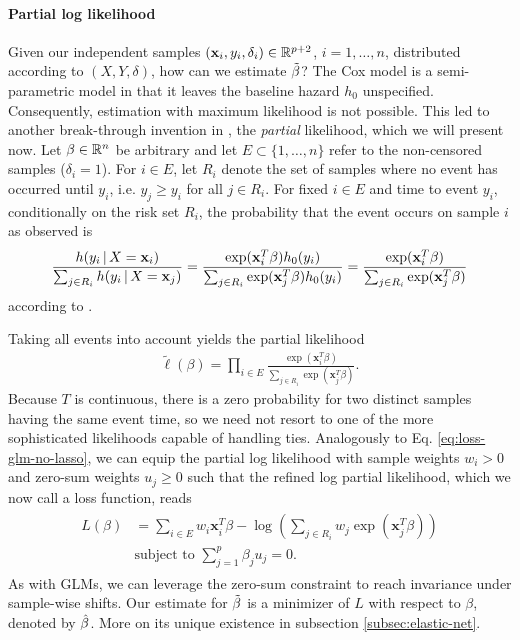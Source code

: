 \paragraph{Partial log likelihood}
Given our independent samples $(\mathbf{x}_i, y_i, \delta_i) \in \mathbb{R}^{p+2}$, $i = 1, \ldots, n$, distributed 
according to $(X, Y, \delta)$, how can we estimate $\tilde{\beta}$? The Cox model is a semi-parametric 
model in that it leaves the baseline hazard $h_0$ unspecified. Consequently, estimation with maximum 
likelihood is not possible. This led to another break-through invention in \cite{cox72}, the 
\textit{partial} likelihood, which we will present now. Let $\beta \in \mathbb{R}^n$ be arbitrary and let 
$E \subset \{ 1, \ldots, n \}$ refer to the non-censored samples ($\delta_i = 1$). For $i \in E$, 
let $R_i$ denote the set of samples 
where no event has occurred until $y_i$, i.e. $y_j \geq y_i$ for all $j \in R_i$. For
fixed $i \in E$ and time to event $y_i$, conditionally on the risk set $R_i$, the probability that 
the event occurs on sample $i$ as observed is
\begin{align}
    \frac{h(y_i \,|\, X = \mathbf{x}_i)}{\sum_{j \in R_i} h(y_i \,|\, X = \mathbf{x}_j)} = 
    \frac{\exp(\mathbf{x}_i^T \beta) h_0(y_i)}{\sum_{j \in R_i} \exp(\mathbf{x}_j^T \beta) h_0(y_i)} = 
    \frac{\exp(\mathbf{x}_i^T \beta)}{\sum_{j \in R_i} \exp(\mathbf{x}_j^T \beta)}
\end{align}
according to \cite[Eq. (12)]{cox72}.

Taking all events into account yields the partial likelihood 
\begin{align}\label{eq:cox-partial-lh}
    \tilde{\ell}(\beta) = \prod_{i \in E} \frac{\exp(\mathbf{x}_i^T \beta)}{\sum_{j \in R_i} \exp(\mathbf{x}_j^T 
    \beta)}.
\end{align}
Because $T$ is continuous, there is a zero probability for two distinct samples having the same 
event time, so we need not resort to one of the more sophisticated likelihoods capable of handling ties.
Analogously to Eq. \eqref{eq:loss-glm-no-lasso}, we can equip the partial log likelihood with sample 
weights $w_i > 0$ and zero-sum weights $u_j \geq 0$ such that the refined log partial likelihood, 
which we now call a loss function, reads 
\begin{align}\label{eq:cox-loss}
\begin{split}
    L(\beta) &= \sum_{i \in E} w_i \mathbf{x}_i^T \beta - \log \left( \sum_{j \in R_i} w_j \exp(\mathbf{x}_j^T
    \beta) \right) \\
    & \text{subject to } \sum_{j=1}^p \beta_j u_j = 0.
\end{split}
\end{align}
As with GLMs, we can leverage the zero-sum constraint to reach invariance under sample-wise shifts. 
Our estimate for $\tilde{\beta}$ is a minimizer of $L$ with respect to $\beta$, denoted by $\hat{\beta}$. 
More on its unique existence in subsection \ref{subsec:elastic-net}.

